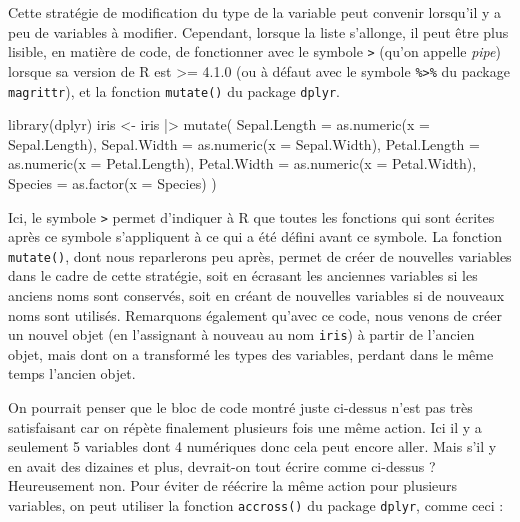 \documentclass[
]{book}
\newenvironment{Shaded}{\begin{snugshade}}{\end{snugshade}}
\newcommand{\AttributeTok}[1]{\textcolor[rgb]{0.77,0.63,0.00}{#1}}
\newcommand{\FunctionTok}[1]{\textcolor[rgb]{0.00,0.00,0.00}{#1}}
\newcommand{\NormalTok}[1]{#1}
\newcommand{\OtherTok}[1]{\textcolor[rgb]{0.56,0.35,0.01}{#1}}
\newcommand{\SpecialCharTok}[1]{\textcolor[rgb]{0.00,0.00,0.00}{#1}}
\begin{document}
Cette stratégie de modification du type de la variable peut convenir lorsqu'il y a peu de variables à modifier. Cependant, lorsque la liste s'allonge, il peut être plus lisible, en matière de code, de fonctionner avec le symbole \texttt{\textbar{}\textgreater{}} (qu'on appelle \emph{pipe}) lorsque sa version de R est \textgreater= 4.1.0 (ou à défaut avec le symbole \texttt{\%\textgreater{}\%} du package \texttt{magrittr}), et la fonction \texttt{mutate()} du package \texttt{dplyr}.

\begin{Shaded}
\begin{Highlighting}[]
\FunctionTok{library}\NormalTok{(dplyr)}
\NormalTok{iris }\OtherTok{\textless{}{-}}
\NormalTok{  iris }\SpecialCharTok{|\textgreater{}} 
  \FunctionTok{mutate}\NormalTok{(}
    \AttributeTok{Sepal.Length =} \FunctionTok{as.numeric}\NormalTok{(}\AttributeTok{x =}\NormalTok{ Sepal.Length),}
    \AttributeTok{Sepal.Width =} \FunctionTok{as.numeric}\NormalTok{(}\AttributeTok{x =}\NormalTok{ Sepal.Width),}
    \AttributeTok{Petal.Length =} \FunctionTok{as.numeric}\NormalTok{(}\AttributeTok{x =}\NormalTok{ Petal.Length),}
    \AttributeTok{Petal.Width =} \FunctionTok{as.numeric}\NormalTok{(}\AttributeTok{x =}\NormalTok{ Petal.Width),}
    \AttributeTok{Species =} \FunctionTok{as.factor}\NormalTok{(}\AttributeTok{x =}\NormalTok{ Species)}
\NormalTok{  )}
\end{Highlighting}
\end{Shaded}

Ici, le symbole \texttt{\textbar{}\textgreater{}} permet d'indiquer à R que toutes les fonctions qui sont écrites après ce symbole s'appliquent à ce qui a été défini avant ce symbole. La fonction \texttt{mutate()}, dont nous reparlerons peu après, permet de créer de nouvelles variables dans le cadre de cette stratégie, soit en écrasant les anciennes variables si les anciens noms sont conservés, soit en créant de nouvelles variables si de nouveaux noms sont utilisés. Remarquons également qu'avec ce code, nous venons de créer un nouvel objet (en l'assignant à nouveau au nom \texttt{iris}) à partir de l'ancien objet, mais dont on a transformé les types des variables, perdant dans le même temps l'ancien objet.

On pourrait penser que le bloc de code montré juste ci-dessus n'est pas très satisfaisant car on répète finalement plusieurs fois une même action. Ici il y a seulement 5 variables dont 4 numériques donc cela peut encore aller. Mais s'il y en avait des dizaines et plus, devrait-on tout écrire comme ci-dessus ? Heureusement non. Pour éviter de réécrire la même action pour plusieurs variables, on peut utiliser la fonction \texttt{accross()} du package \texttt{dplyr}, comme ceci :
\end{document}
